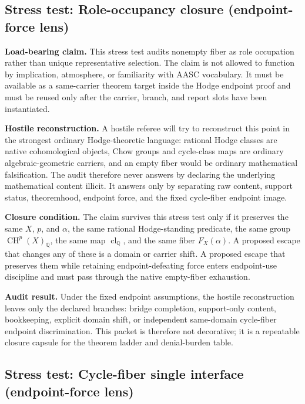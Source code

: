 \documentclass[11pt]{article}
\newcommand{\QQ}{\mathbb{Q}}
\newcommand{\CH}{\operatorname{CH}}
\newcommand{\clQ}{\operatorname{cl}_{\QQ}}
\begin{document}
\subsection{Stress test: Role-occupancy closure (endpoint-force lens)}

\par\noindent\textbf{Load-bearing claim.} This stress test audits nonempty fiber as role occupation rather than unique representative selection. The claim is not allowed to function by implication, atmosphere, or familiarity with AASC vocabulary. It must be available as a same-carrier theorem target inside the Hodge endpoint proof and must be reused only after the carrier, branch, and report slots have been instantiated.

\par\noindent\textbf{Hostile reconstruction.} A hostile referee will try to reconstruct this point in the strongest ordinary Hodge-theoretic language: rational Hodge classes are native cohomological objects, Chow groups and cycle-class maps are ordinary algebraic-geometric carriers, and an empty fiber would be ordinary mathematical falsification. The audit therefore never answers by declaring the underlying mathematical content illicit. It answers only by separating raw content, support status, theoremhood, endpoint force, and the fixed cycle-fiber endpoint image.

\par\noindent\textbf{Closure condition.} The claim survives this stress test only if it preserves the same $X$, $p$, and $\alpha$, the same rational Hodge-standing predicate, the same group $\CH^p(X)_\QQ$, the same map $\clQ$, and the same fiber $F_X(\alpha)$. A proposed escape that changes any of these is a domain or carrier shift. A proposed escape that preserves them while retaining endpoint-defeating force enters endpoint-use discipline and must pass through the native empty-fiber exhaustion.

\par\noindent\textbf{Audit result.} Under the fixed endpoint assumptions, the hostile reconstruction leaves only the declared branches: bridge completion, support-only content, bookkeeping, explicit domain shift, or independent same-domain cycle-fiber endpoint discrimination. This packet is therefore not decorative; it is a repeatable closure capsule for the theorem ladder and denial-burden table.


\subsection{Stress test: Cycle-fiber single interface (endpoint-force lens)}
\end{document}
